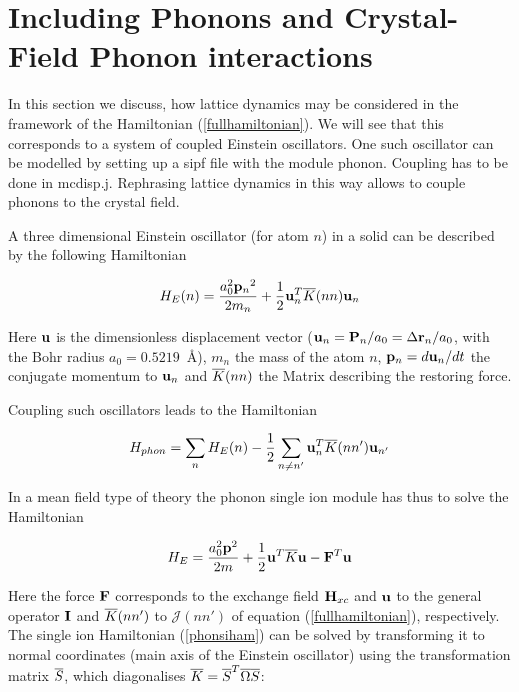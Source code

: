 \section{Including Phonons and Crystal-Field Phonon interactions}\label{phonons}

In this section we discuss, how lattice dynamics may be considered in the framework of
the Hamiltonian (\ref{fullhamiltonian}). We will see that this corresponds 
to a system of coupled Einstein oscillators. One such oscillator can be modelled 
by setting up a {\prg sipf} file with the module {\prg phonon}. Coupling has
to be done in {\prg mcdisp.j}. Rephrasing lattice dynamics in this way allows 
to couple phonons to the crystal field.

A three dimensional Einstein oscillator (for atom $n$) in a solid can be described by 
the following Hamiltonian

\begin{equation}\label{einstein}
H_E(n)=\frac{a_0^2{\mathbf p_n}^2}{2m_n} + \frac{1}{2} {\mathbf u}^T_n \overline{K}(nn) {\mathbf u}_n
\end{equation}

Here $\mathbf u$ is the dimensionless displacement vector ($\mathbf u_n={\mathbf P}_n/a_0=\Delta {\mathbf r}_n/a_0$, 
with the Bohr radius $a_0=0.5219$~\AA), $m_n$ the
mass of the atom $n$, $\mathbf p_n=d\mathbf u_n/dt$ the conjugate momentum to $\mathbf u_n$ and
$\overline{K}(nn)$ the Matrix describing the restoring force.

Coupling such oscillators leads to the Hamiltonian

\begin{equation}
H_{phon}=\sum_n H_E(n) -\frac{1}{2} \sum_{n\neq n'} {\mathbf u}_n^T \overline{K}(nn')  {\mathbf u}_{n'}
\end{equation}

In a mean field type of theory 
the phonon single ion module has thus to solve the Hamiltonian

\begin{equation}\label{phonsiham}
H_E=\frac{a_0^2{\mathbf p}^2}{2m} + \frac{1}{2} {\mathbf u}^T \overline{K} {\mathbf u} - {\mathbf F}^T {\mathbf u}
\end{equation}

Here the force $\mathbf F$ corresponds to the exchange field $\mathbf H_{xc}$ and $\mathbf u$ to
 the general operator $\mathbf I$ and $\overline{K}(nn')$ to $\mathcal J(nn')$ of equation (\ref{fullhamiltonian}),
respectively. The single ion Hamiltonian (\ref{phonsiham}) can be solved by transforming
it to normal coordinates (main axis of the Einstein oscillator) using the transformation
matrix $\overline{S}$, which diagonalises $\overline{K}=\overline{S}^T\overline{\Omega}\overline{S}$:

